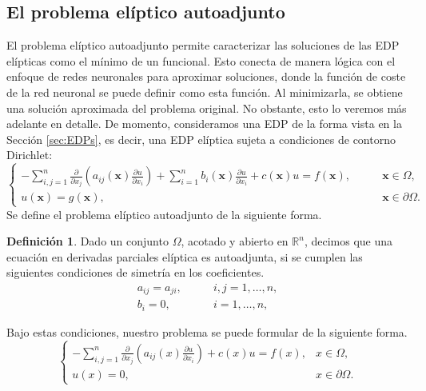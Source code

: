\documentclass[a4paper,11pt,spanish, twoside, leqno]{tfg-uam}
\theoremstyle{definition}
\newtheorem{defin}[teor]{Definici\'on}
\begin{document}
\subsection{El problema elíptico autoadjunto}\label{sec:ProblemaAutoadjunto}

El problema elíptico autoadjunto  permite caracterizar las soluciones de las EDP elípticas como el mínimo de un funcional. Esto conecta de manera lógica con el enfoque de redes neuronales para aproximar soluciones, donde la función de coste de la red neuronal se puede definir como esta función. Al minimizarla, se obtiene una solución aproximada del problema original. No obstante, esto lo veremos más adelante en detalle. De momento, consideramos una EDP de la forma vista en la Sección \ref{sec:EDPs}, es decir, una EDP elíptica sujeta a condiciones de contorno Dirichlet:
\begin{equation} 
    \begin{cases} -\sum_{i,j=1}^{n} \frac{\partial}{\partial x_j}\left( a_{ij}(\mathbf{x})\frac{\partial u}{\partial x_i}\right) + \sum_{i=1}^{n} b_i(\mathbf{x})\frac{\partial u}{\partial x_i} + c(\mathbf{x})u = f(\mathbf{x}), &\qquad \mathbf{x}\in\Omega,\\ u(\mathbf{x}) = g(\mathbf{x}), &\qquad \mathbf{x}\in\partial\Omega. 
    \end{cases} 
\end{equation} 
Se define el problema elíptico autoadjunto de la siguiente forma.
\begin{mdframed}
\begin{defin}
    Dado un conjunto $\Omega$, acotado y abierto en $\mathbb{R}^n$, decimos que una ecuación en derivadas parciales elíptica es autoadjunta, si se cumplen las siguientes condiciones de simetría en los coeficientes.
    \begin{equation}\label{eq:simetria_a}
        \begin{split}
            a_{ij} = a_{ji},\qquad &i,j = 1,\dots,n,\\
            b_i = 0, \qquad &i = 1,\dots,n,
        \end{split}
    \end{equation}
\end{defin}
\end{mdframed}
Bajo estas condiciones, nuestro problema se puede formular de la siguiente forma.
\begin{equation} \label{eq:ProblemaAutoadjuntoFuerte}
    \begin{cases}
        -\sum_{i,j=1}^{n} \frac{\partial}{\partial x_j}\left( a_{ij}(x)\frac{\partial u}{\partial x_i}\right) + c(x)u = f(x), & x\in\Omega,\\
        u(x) = 0, & x\in\partial\Omega.
    \end{cases}
\end{equation}
\end{document}
